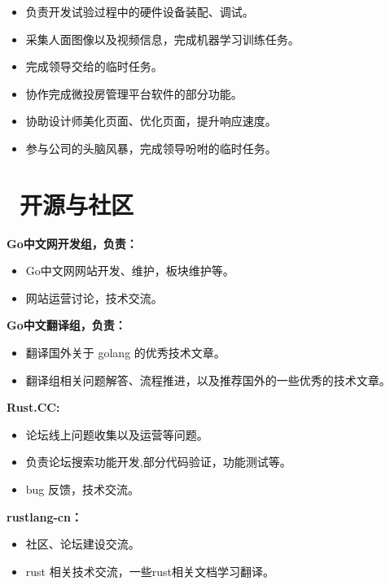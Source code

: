 \documentclass{resume}
\begin{document}
{
\vspace{-0.5ex}
\begin{itemize}
  \item 负责开发试验过程中的硬件设备装配、调试。
  \item 采集人面图像以及视频信息，完成机器学习训练任务。
  \item 完成领导交给的临时任务。
\end{itemize}

\vspace{-0.5ex}
\begin{itemize}
  \item 协作完成微投房管理平台软件的部分功能。
  \item 协助设计师美化页面、优化页面，提升响应速度。
  \item 参与公司的头脑风暴，完成领导吩咐的临时任务。
\end{itemize}


\section{\faGithubAlt\ 开源与社区}
\textbf{\small Go中文网开发组，负责：}
\begin{itemize}
  \item Go中文网网站开发、维护，板块维护等。
  \item 网站运营讨论，技术交流。
\end{itemize}
\textbf{\small Go中文翻译组，负责：}
\begin{itemize}
  \item 翻译国外关于 golang 的优秀技术文章。
  \item 翻译组相关问题解答、流程推进，以及推荐国外的一些优秀的技术文章。
\end{itemize}

\textbf{\small Rust.CC:}
\begin{itemize}
  \item 论坛线上问题收集以及运营等问题。
  \item 负责论坛搜索功能开发,部分代码验证，功能测试等。
  \item bug 反馈，技术交流。
\end{itemize}
\textbf{\small rustlang-cn：}
\begin{itemize}
  \item 社区、论坛建设交流。
  \item rust 相关技术交流，一些rust相关文档学习翻译。
\end{itemize}


}
\end{document}

